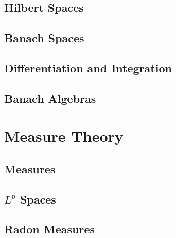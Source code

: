 \documentclass[12pt]{report}
\begin{document}
\chapter{Hilbert Spaces}


\chapter{Banach Spaces}



\chapter{Differentiation and Integration}


\chapter{Banach Algebras}


\part{Measure Theory}

\chapter{Measures}

\chapter{\texorpdfstring{$L^p$ Spaces}{}}

\chapter{Radon Measures}
\end{document}
